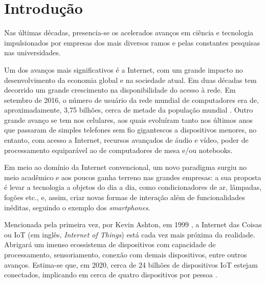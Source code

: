 \chapter{Introdução}










Nas últimas décadas, presencia-se os acelerados avanços em ciência e tecnologia impulsionados por empresas dos mais diversos ramos e pelas constantes pesquisas nas universidades. 


Um dos avanços mais significativos é a Internet, com um grande impacto no desenvolvimento da economia global e na sociedade atual. Em duas décadas tem decorrido um grande crescimento na disponibilidade do acesso à rede. Em setembro de 2016, o número de usuário da rede mundial de computadores era de, aproximadamente, 3,75 bilhões, cerca de metade da população mundial \cite{Stats2017}.  Outro grande avanço se tem nos celulares, aos quais evoluíram tanto nos últimos anos que passaram de simples telefones sem fio gigantescos a dispositivos menores, no entanto, com acesso a Internet, recursos avançados de áudio e vídeo, poder de processamento equiparável ao de computadores de mesa e/ou notebooks.

Em meio ao domínio da Internet convencional, um novo paradigma surgiu no meio acadêmico e aos poucos ganha terreno nas grandes empresas: a sua proposta é levar a tecnologia a objetos do dia a dia, como condicionadores de ar, lâmpadas, fogões etc., e, assim, criar novas formas de interação além de funcionalidades inéditas, seguindo o exemplo dos \textit{smartphones}. 

Mencionada pela primeira vez, por Kevin Ashton, em 1999 \cite{Ashton2009}, a Internet das Coisas ou IoT (em inglês, \textit{Internet of Things}) está cada vez mais próxima da realidade. Abrigará um imenso ecossistema de dispositivos com capacidade de processamento, sensoriamento, conexão com demais dispositivos, entre outros avanços. Estima-se que, em 2020, cerca de 24 bilhões de dispositivos IoT estejam conectados, implicando em cerca de quatro dispositivos por pessoa \cite{Meola2016}. 

